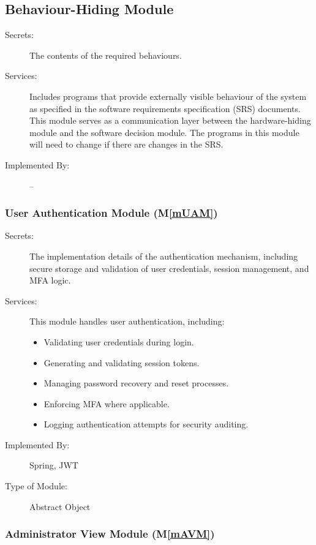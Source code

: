\documentclass[12pt, titlepage]{article}
\newcommand{\mref}[1]{M\ref{#1}}
\begin{document}
\subsection{Behaviour-Hiding Module}

\begin{description}
\item[Secrets:]The contents of the required behaviours.
\item[Services:]Includes programs that provide externally visible behaviour of the system as specified in the software requirements specification (SRS) documents. This module serves as a communication layer between the hardware-hiding module and the software decision module. The programs in this module will need to change if there are changes in the SRS.
\item[Implemented By:] --
\end{description}

\subsubsection{User Authentication Module (\mref{mUAM})} 

\begin{description}
\item[Secrets:] The implementation details of the authentication mechanism, including secure storage and validation of user credentials, session management, and MFA logic.
\item[Services:] This module handles user authentication, including:
\begin{itemize}
    \item Validating user credentials during login.
    \item Generating and validating session tokens.
    \item Managing password recovery and reset processes.
    \item Enforcing MFA where applicable.
    \item Logging authentication attempts for security auditing.
\end{itemize}
\item[Implemented By:] Spring, JWT
\item[Type of Module:] Abstract Object
\end{description}

\subsubsection{Administrator View Module (\mref{mAVM})}
\end{document}
